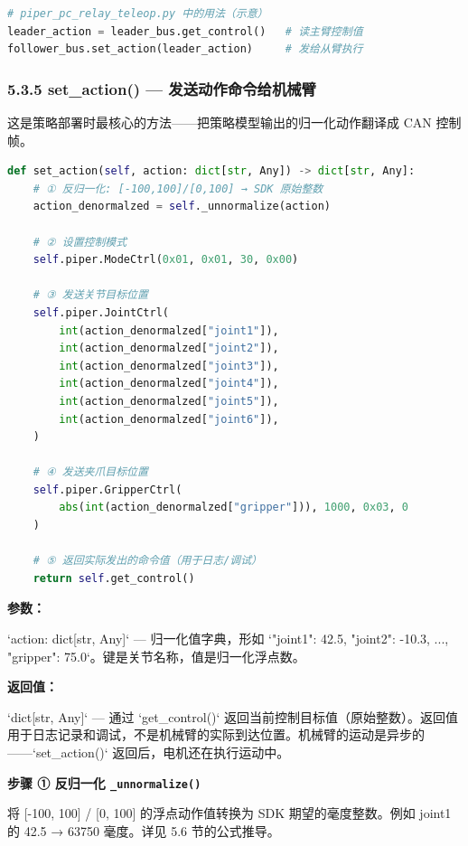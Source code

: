 \documentclass[UTF8,a4paper,11pt]{ctexart}
\begin{document}
\begin{lstlisting}[language=python]
# piper_pc_relay_teleop.py 中的用法（示意）
leader_action = leader_bus.get_control()   # 读主臂控制值
follower_bus.set_action(leader_action)     # 发给从臂执行
\end{lstlisting}

\subsubsection{5.3.5 set_action() — 发送动作命令给机械臂}

这是策略部署时最核心的方法——把策略模型输出的归一化动作翻译成 CAN 控制帧。

\begin{lstlisting}[language=python]
def set_action(self, action: dict[str, Any]) -> dict[str, Any]:
    # ① 反归一化: [-100,100]/[0,100] → SDK 原始整数
    action_denormalzed = self._unnormalize(action)

    # ② 设置控制模式
    self.piper.ModeCtrl(0x01, 0x01, 30, 0x00)

    # ③ 发送关节目标位置
    self.piper.JointCtrl(
        int(action_denormalzed["joint1"]),
        int(action_denormalzed["joint2"]),
        int(action_denormalzed["joint3"]),
        int(action_denormalzed["joint4"]),
        int(action_denormalzed["joint5"]),
        int(action_denormalzed["joint6"]),
    )

    # ④ 发送夹爪目标位置
    self.piper.GripperCtrl(
        abs(int(action_denormalzed["gripper"])), 1000, 0x03, 0
    )

    # ⑤ 返回实际发出的命令值（用于日志/调试）
    return self.get_control()
\end{lstlisting}

\textbf{参数：}

\item `action: dict[str, Any]` — 归一化值字典，形如 `{"joint1": 42.5, "joint2": -10.3, ..., "gripper": 75.0}`。键是关节名称，值是归一化浮点数。

\textbf{返回值：}

\item `dict[str, Any]` — 通过 `get_control()` 返回当前控制目标值（原始整数）。返回值用于日志记录和调试，不是机械臂的实际到达位置。机械臂的运动是异步的——`set_action()` 返回后，电机还在执行运动中。

\textbf{步骤 ① 反归一化 \texttt{_unnormalize()}}

将 [-100, 100] / [0, 100] 的浮点动作值转换为 SDK 期望的毫度整数。例如 joint1 的 42.5 → 63750 毫度。详见 5.6 节的公式推导。
\end{document}
